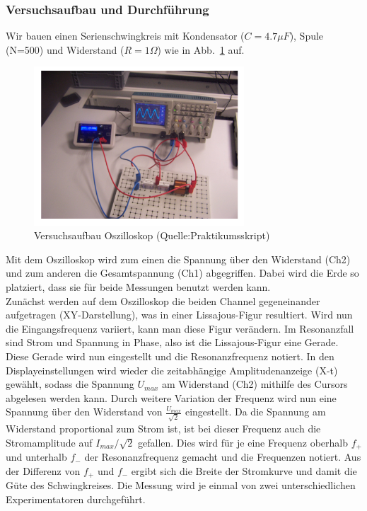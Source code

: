 \documentclass[12pt,a4paper]{article}
\begin{document}
\subsubsection{Versuchsaufbau und Durchführung}
Wir bauen einen Serienschwingkreis mit Kondensator ($C=4.7\mu F$), Spule (N=500) und Widerstand ($R=1\Omega$) wie in Abb.~\ref{Aufbau_Oszilloskop} auf.
\begin{figure}[H]
	\centering
	\includegraphics[width=0.7\textwidth]{Daten/Aufbau_Oszilloskop.png}
	\caption{Versuchsaufbau Oszilloskop (Quelle:Praktikumsskript)}
	\label{Aufbau_Oszilloskop}
\end{figure}
Mit dem Oszilloskop wird zum einen die Spannung über den Widerstand (Ch2) und zum anderen die Gesamtspannung (Ch1) abgegriffen. Dabei wird die Erde so platziert, dass sie für beide Messungen benutzt werden kann.\\
Zunächst werden auf dem Oszilloskop die beiden Channel gegeneinander aufgetragen (XY-Darstellung), was in einer Lissajous-Figur resultiert. Wird nun die Eingangsfrequenz variiert, kann man diese Figur verändern. Im Resonanzfall sind Strom und Spannung in Phase, also ist die Lissajous-Figur eine Gerade. Diese Gerade wird nun eingestellt und die Resonanzfrequenz notiert. In den Displayeinstellungen wird wieder die zeitabhängige Amplitudenanzeige (X-t) gewählt, sodass die Spannung $U_{max}$ am Widerstand (Ch2) mithilfe des Cursors abgelesen werden kann. Durch weitere Variation der Frequenz wird nun eine Spannung über den Widerstand von $\frac{U_{max}}{\sqrt{2}}$ eingestellt. Da die Spannung am Widerstand proportional zum Strom ist, ist bei dieser Frequenz auch die Stromamplitude auf $I_{max}/\sqrt{2}$ gefallen. Dies wird für je eine Frequenz oberhalb $f_+$ und unterhalb $f_-$ der Resonanzfrequenz gemacht und die Frequenzen notiert. Aus der Differenz von $f_+$ und $f_-$ ergibt sich die Breite der Stromkurve und damit die Güte des Schwingkreises. Die Messung wird je einmal von zwei unterschiedlichen Experimentatoren durchgeführt.
\end{document}
